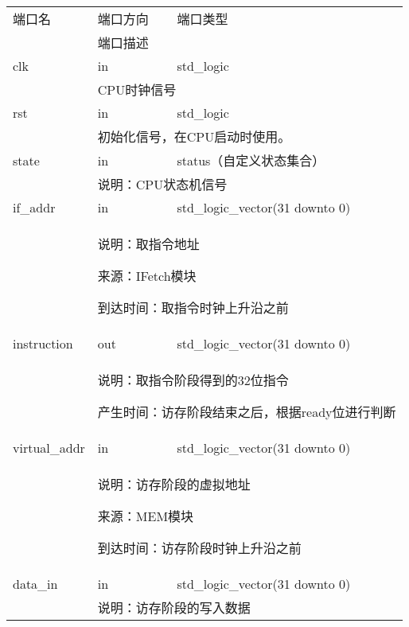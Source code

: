         \begin{tabularx}{\textwidth}{lll}
            \toprule
            端口名          & 端口方向  & 端口类型 \\
            \cmidrule(l){2-3}
            &
            \multicolumn{2}{X}{端口描述} \\
            \midrule
            clk             & in        & std\_logic \\
            \cmidrule(l){2-3}
            &
            \multicolumn{2}{X}{
                CPU时钟信号
            } \\
            \midrule
            rst             & in        & std\_logic \\
            \cmidrule(l){2-3}
            &
            \multicolumn{2}{X}{
                初始化信号，在CPU启动时使用。
            } \\
            \midrule
            state           & in        & status（自定义状态集合） \\
            \cmidrule(l){2-3}
            &
            \multicolumn{2}{X}{
                说明：CPU状态机信号
            } \\
            \midrule
            if\_addr        & in        & std\_logic\_vector(31 downto 0) \\
            \cmidrule(l){2-3}
            &
            \multicolumn{2}{X}{
                说明：取指令地址

                来源：IFetch模块

                到达时间：取指令时钟上升沿之前
            } \\
            \midrule
            instruction        & out        & std\_logic\_vector(31 downto 0) \\
            \cmidrule(l){2-3}
            &
            \multicolumn{2}{X}{
                说明：取指令阶段得到的32位指令

                产生时间：访存阶段结束之后，根据ready位进行判断
            } \\
            \midrule
            virtual\_addr & in      & std\_logic\_vector(31 downto 0) \\
            \cmidrule(l){2-3}
            &
            \multicolumn{2}{X}{
                说明：访存阶段的虚拟地址

                来源：MEM模块

                到达时间：访存阶段时钟上升沿之前
            } \\
            \midrule
            data\_in & in     & std\_logic\_vector(31 downto 0) \\
            \cmidrule(l){2-3}
            &
            \multicolumn{2}{X}{
                说明：访存阶段的写入数据

}
\end{tabularx}
